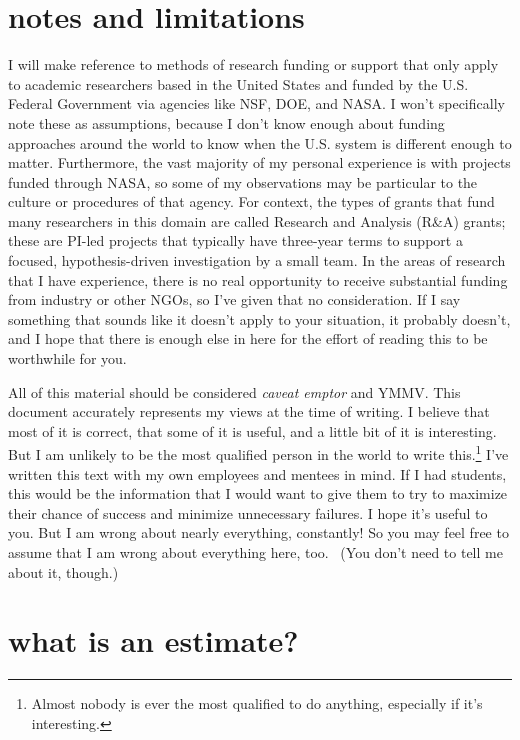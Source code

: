 \documentclass[12pt,oneside]{book}
\begin{document}
\newpage
{}
\section*{notes and limitations}

I will make reference to methods of research funding or support that only apply to academic researchers based in the United States and funded by the U.S. Federal Government via agencies like NSF, DOE, and NASA. I won't specifically note these as assumptions, because I don't know enough about funding approaches around the world to know when the U.S. system is different enough to matter. Furthermore, the vast majority of my personal experience is with projects funded through NASA, so some of my observations may be particular to the culture or procedures of that agency. For context, the types of grants that fund many researchers in this domain are called Research and Analysis (R\&A) grants; these are PI-led projects that typically have three-year terms to support a focused, hypothesis-driven investigation by a small team. In the areas of research that I have experience, there is no real opportunity to receive substantial funding from industry or other NGOs, so I've given that no consideration. If I say something that sounds like it doesn't apply to your situation, it probably doesn't, and I hope that there is enough else in here for the effort of reading this to be worthwhile for you.

All of this material should be considered \emph{caveat emptor} and YMMV. This document accurately represents my views at the time of writing. I believe that most of it is correct, that some of it is useful, and a little bit of it is interesting. But I am unlikely to be the most qualified person in the world to write this.\footnote{
Almost nobody is ever the most qualified to do anything, especially if it's interesting.}
I've written this text with my own employees and mentees in mind. If I had students, this would be the information that I would want to give them to try to maximize their chance of success and minimize unnecessary failures. I hope it's useful to you. But I am wrong about nearly everything, constantly! So you may feel free to assume that I am wrong about everything here, too.  (You don't need to tell me about it, though.)

\newpage
{}
\section*{what is an estimate?}
\end{document}
